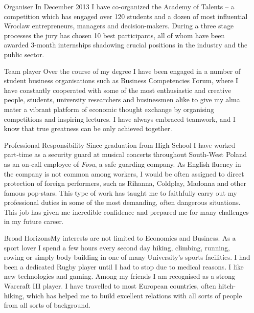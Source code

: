 \documentclass{piotrcv}
\begin{document}
\begin{skillist}
\item{Organiser} {In December 2013 I have co-organized the Academy of Talents -- a competition which has engaged over 120 students and a dozen of most influential Wroclaw entrepreneurs, managers and decision-makers. During a three stage processes the jury has chosen 10 best participants, all of whom have been awarded 3-month internships shadowing crucial positions in the industry and the public sector.}
\item{Team player} {Over the course of my degree I have been engaged in a number of student business organisations such as Business Competencies Forum, where I have constantly cooperated with some of the most enthusiastic and creative people, students, university researchers and businessmen alike to give my alma mater a vibrant platform of economic thought exchange by organising competitions and inspiring lectures. I have always embraced teamwork, and I know that true greatness can be only achieved together.}
\item{Professional Responsibility} {Since graduation from High School I have worked part-time as a security guard at musical concerts throughout South-West Poland as an on-call employee of \textit{Fosa}, a safe guarding company. As English fluency in the company is not common among workers, I would be often assigned to direct protection of foreign performers, such as Rihanna, Coldplay, Madonna and other famous pop-stars. This type of work has taught me to faithfully carry out my professional duties in some of the most demanding, often dangerous situations. This job has given me incredible confidence and prepared me for many challenges in my future career.}
\item{Broad Horizons}{My interests are not limited to Economics and Business. As a sport lover I spend a few hours every second day hiking, climbing, running, rowing or simply body-building in one of many University's sports facilities. I had been a dedicated Rugby player until I had to stop due to medical reasons. I like new technologies and gaming. Among my friends I am recognised as a strong Warcraft III player. I have travelled to most European countries, often hitch-hiking, which has helped me to build excellent relations with all sorts of people from all sorts of background.}
\end{skillist}

\newpage

\section{\specialname}
\specialcontents
\end{document}
